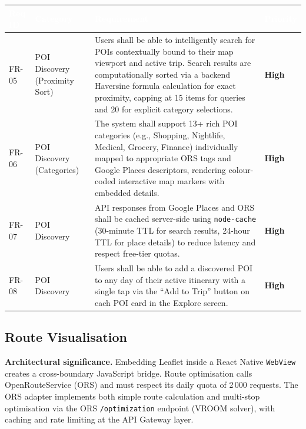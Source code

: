 \documentclass[12pt, a4paper]{article}
\newcommand{\reqid}[1]{\textsc{\small #1}}
\newcommand{\high}{\textbf{High}}
\newcommand{\thcell}[1]{\textcolor{white}{\textbf{\small #1}}}
\begin{document}
\vspace{0.4em}
\begin{longtable}{C{1.6cm} C{2.0cm} L{8.2cm} C{1.8cm}}
\toprule
{}
\thcell{Req ID} & \thcell{Category} & \thcell{Requirement} & \thcell{Priority} \\
\midrule
\endhead
\bottomrule
\endfoot

\reqid{FR-05} & POI Discovery (Proximity Sort) &
Users shall be able to intelligently search for POIs contextually bound to their map viewport and active trip. Search results are computationally sorted via a backend Haversine formula calculation for exact proximity, capping at 15 items for queries and 20 for explicit category selections. &
\high \\

\reqid{FR-06} & POI Discovery (Categories) &
The system shall support 13+ rich POI categories (e.g., Shopping, Nightlife, Medical, Grocery, Finance) individually mapped to appropriate ORS tags and Google Places descriptors, rendering colour-coded interactive map markers with embedded details. &
\high \\

\reqid{FR-07} & POI Discovery &
API responses from Google Places and ORS shall be cached server-side using \texttt{node-cache} (30-minute TTL for search results, 24-hour TTL for place details) to reduce latency and respect free-tier quotas. &
\high \\

\reqid{FR-08} & POI Discovery &
Users shall be able to add a discovered POI to any day of their active itinerary with a single tap via the ``Add to Trip'' button on each POI card in the Explore screen. &
\high \\

\end{longtable}

\subsection{Route Visualisation}

\begin{tcolorbox}[notebox]
  \textbf{Architectural significance.} Embedding Leaflet inside a React Native \texttt{WebView} creates a cross-boundary JavaScript bridge. Route optimisation calls OpenRouteService (ORS) and must respect its daily quota of 2\,000 requests. The ORS adapter implements both simple route calculation and multi-stop optimisation via the ORS \texttt{/optimization} endpoint (VROOM solver), with caching and rate limiting at the API Gateway layer.
\end{tcolorbox}
\end{document}
